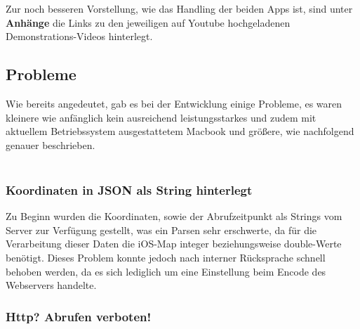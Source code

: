 Zur noch besseren Vorstellung, wie das Handling der beiden Apps ist, sind unter \textbf{Anhänge} die Links zu den jeweiligen auf Youtube hochgeladenen Demonstrations-Videos hinterlegt.



\subsection{Probleme}
Wie bereits angedeutet, gab es bei der Entwicklung einige Probleme, es waren kleinere wie anfänglich kein ausreichend leistungsstarkes und zudem mit aktuellem Betriebssystem ausgestattetem Macbook und größere, wie nachfolgend genauer beschrieben.
\\
\\
\subsubsection{Koordinaten in JSON als String hinterlegt}

Zu Beginn wurden die Koordinaten, sowie der Abrufzeitpunkt als Strings vom Server zur Verfügung gestellt, was ein Parsen sehr erschwerte, da für die Verarbeitung dieser Daten die iOS-Map integer beziehungsweise double-Werte benötigt. Dieses Problem konnte jedoch nach interner Rücksprache schnell behoben werden, da es sich lediglich um eine Einstellung beim Encode des Webservers handelte.

\subsubsection{Http? Abrufen verboten!}

